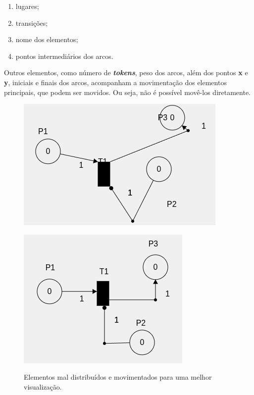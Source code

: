 \documentclass[
	12pt,				%
	openright,			%
	oneside,			%
	a4paper,			%
	english,			%
	brazil				%
	]{abntex2}
\begin{document}
\begin{enumerate}
	\item lugares;
	\item transições;
	\item nome dos elementos;
	\item pontos intermediários dos arcos.
\end{enumerate}

Outros elementos, como número de \textbf{\textit{tokens}}, peso dos arcos, além dos pontos \textbf{x} e \textbf{y}, iniciais e finais dos arcos, acompanham a movimentação dos elementos principais, que podem ser movidos. Ou seja, não é possível movê-los diretamente.

\begin{figure}[ht]
	\centering
	\begin{minipage}{0.49\textwidth}
		\centering
		\includegraphics[scale=0.5]{figuras/move_mal_distribuido.png}
		\label{fig:move_mal_distribuido}
	\end{minipage}
	\hfill
	\begin{minipage}{0.49\textwidth}
		\centering
		\includegraphics[scale=0.5]{figuras/move_bem_distribuido.png}
		\label{fig:move_mal_distribuido}
	\end{minipage}
	\caption{Elementos mal distribuídos e movimentados para uma melhor visualização.}
\end{figure}
\FloatBarrier
\end{document}
